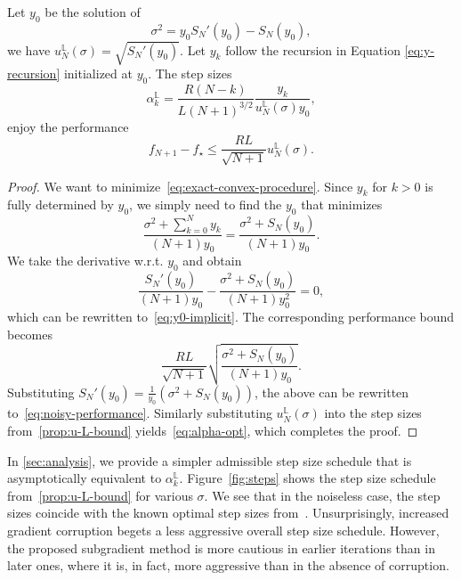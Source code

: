 \documentclass{article}
\begin{document}
\begin{toappendix}
\begin{theorem}\label{thm:optimal-bound-z}
Let $y_0$ be the solution of
\begin{equation}\label{eq:y0-implicit}
\sigma^2=y_0S_N'(y_0)-S_N(y_0),
\end{equation}
we have $u^{\mathbb L}_N(\sigma)=\sqrt{S_N'(y_0)}$. Let $y_k$ follow the recursion in Equation \eqref{eq:y-recursion} initialized at $y_0$. The step sizes
\begin{equation}\label{eq:alpha-opt}
\alpha_k^{\mathbb L}=\frac{R(N-k)}{L (N+1)^{3/2}}\frac{y_k}{u^{\mathbb L}_N(\sigma)y_0},
\end{equation}
enjoy the performance
\begin{equation}\label{eq:noisy-performance}
f_{N+1}-f_\star\le\frac{RL}{\sqrt{N+1}}u^{\mathbb L}_N(\sigma).
\end{equation}
\end{theorem}
\begin{proof}
    We want to minimize~\eqref{eq:exact-convex-procedure}.
    Since $y_k$ for $k>0$ is fully determined by $y_0$, we simply need to find the $y_0$ that minimizes
    \[
    \frac{\sigma^2+\sum_{k=0}^Ny_k}{(N+1)y_0}=\frac{\sigma^2+S_N(y_0)}{(N+1)y_0}.
    \]
    We take the derivative w.r.t. $y_0$ and obtain
    \[
    \frac{S_N'(y_0)}{(N+1)y_0}-\frac{\sigma^2+S_N(y_0)}{(N+1)y_0^2}=0,
    \]
    which can be rewritten to~\eqref{eq:y0-implicit}.
    The corresponding performance bound becomes
    \[
    \frac{RL}{\sqrt{N+1}}\sqrt{\frac{\sigma^2+S_N(y_0)}{(N+1)y_0}}.
    \]
    Substituting $S_N'(y_0)=\frac1{y_0}(\sigma^2+S_N(y_0))$, the above can be rewritten to~\eqref{eq:noisy-performance}.
    Similarly substituting $u_N^{\mathbb L}(\sigma)$ into the step sizes from~\cref{prop:u-L-bound} yields~\eqref{eq:alpha-opt}, which completes the proof.
  \end{proof}
  
  

\end{toappendix}
In \cref{sec:analysis}, we provide a simpler admissible step size schedule that is asymptotically equivalent to $\alpha_k^{\mathbb L}.$
Figure~\ref{fig:steps} shows the step size schedule from~\cref{prop:u-L-bound} for various $\sigma.$
We see that in the noiseless case, the step sizes coincide with the known optimal step sizes from~\cite{zamani2023exact}. Unsurprisingly, increased gradient corruption begets a less aggressive overall step size schedule. However, the proposed subgradient method is more cautious in earlier iterations than in later ones, where it is, in fact, more aggressive than in the absence of corruption. 
\end{document}
